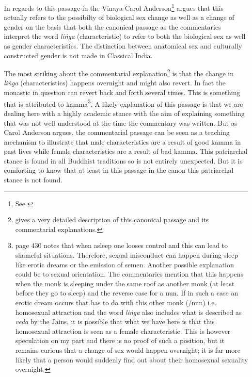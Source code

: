 In regards to this passage in the Vinaya Carol Anderson\footnote{See \cite{anderson2016a}} argues that this actually refers to the possibilty of biological sex change as well as a change of gender on the basis that both the canonical passage as the commentaries interpret the word {\em liṅga} (characteristic) to refer to both the biological sex as well as gender characteristics. The distinction between anatomical sex and culturally constructed gender is not made in Classical India.

The most striking about the commentarial explanation\footnote{\cite{anderson2016} gives a very detailed description of this canonical passage and its commentarial explanations.} is that the change in {\em liṅga} (characteristics) happens overnight and might also revert. In fact the monastic in question can revert back and forth several times. This is something that is attributed to kamma\footnote{\cite{heirman} page 430 notes that when asleep one looses control and this can lead to shameful situations. Therefore, sexual misconduct can happen during sleep like erotic dreams or the emission of semen. Another possible explanation could be to sexual orientation. The commentaries mention that this happens when the monk is sleeping under the same roof as another monk (at least before they go to sleep) and the reverse case for a nun. If in such a case an erotic dream occurs that has to do with this other monk (/nun) i.e. homosexual attraction and the word {\em liṅga} also includes what is described as {\em veda} by the Jains, it is possible that what we have here is that this homosexual attraction is seen as a female characteristic. This is however speculation on my part and there is no proof of such a position, but it remains curious that a change of sex would happen overnight; it is far more likely that a person would suddenly find out about their homosexual sexuality overnight.}. A likely explanation of this passage is that we are dealing here with a highly academic stance with the aim of explaining something that was not well understood at the time the commentary was written. But as Carol Anderson argues, the commentarial passage can be seen as a teaching mechanism to illustrate that male characteristics are a result of good kamma in past lives while female characteristics are a result of bad kamma. This patriarchal stance is found in all Buddhist traditions so is not entirely unexpected. But it is comforting to know that at least in this passage in the canon this patriarchal stance is not found.

